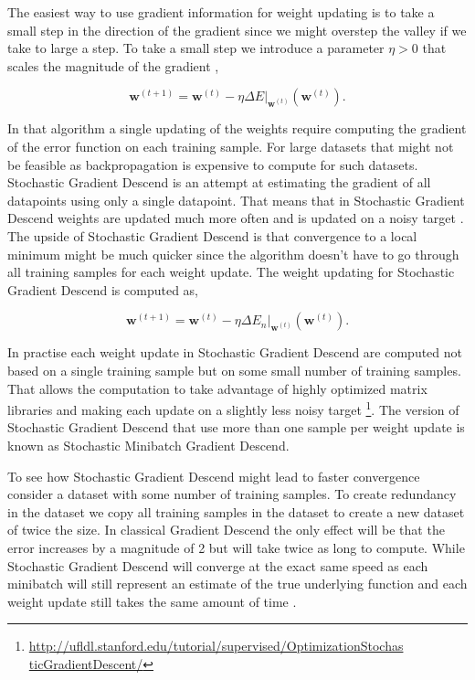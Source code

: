 The easiest way to use gradient information for weight updating is to take a
small step in the direction of the gradient since we might overstep the valley
if we take to large a step. To take a small step we introduce a parameter
$\eta > 0$ that scales the magnitude of the gradient \cite{Bishop},

\begin{equation}
    \mathbf{w}^{(t+1)} =
        \mathbf{\mathbf{w}}^{(t)} -
        \eta\Delta E|_{\mathbf{w}^{(t)}}(\mathbf{w}^{(t)}).
\end{equation}

In that algorithm a single updating of the weights require computing the
gradient of the error function on each training sample. For large datasets
that might not be feasible as backpropagation is expensive to compute for such
datasets. Stochastic Gradient Descend is an attempt at estimating the gradient
of all datapoints using only a single datapoint. That means that in Stochastic
Gradient Descend weights are updated much more often and is updated on a
noisy target \cite{Bishop}. The upside of Stochastic Gradient Descend is that
convergence to a local minimum might be much quicker since the algorithm doesn't
have to go through all training samples for each weight update. The weight
updating for Stochastic Gradient Descend is computed as,

\begin{equation}
    \mathbf{w}^{(t+1)} =
        \mathbf{\mathbf{w}}^{(t)} -
        \eta\Delta E_n|_{\mathbf{w}^{(t)}}(\mathbf{w}^{(t)}).
\end{equation}

In practise each weight update in Stochastic Gradient Descend are computed
not based on a single training sample but on some small number of training
samples. That allows the computation to take advantage of highly optimized
matrix libraries and making each update on a slightly less noisy target
\footnote{\url{http://ufldl.stanford.edu/tutorial/supervised/OptimizationStochas
ticGradientDescent/}}. The version of Stochastic Gradient Descend that use more
than one sample per weight update is known as Stochastic Minibatch Gradient
Descend.

To see how Stochastic Gradient Descend might lead to faster convergence consider
a dataset with some number of training samples. To create redundancy in the
dataset we copy all training samples in the dataset to create a new dataset of
twice the size. In classical Gradient Descend the only effect will be that the
error increases by a magnitude of 2 but will take twice as long to compute.
While Stochastic Gradient Descend will converge at the exact same speed as each
minibatch will still represent an estimate of the true underlying function and
each weight update still takes the same amount of time \cite{Bishop}.


